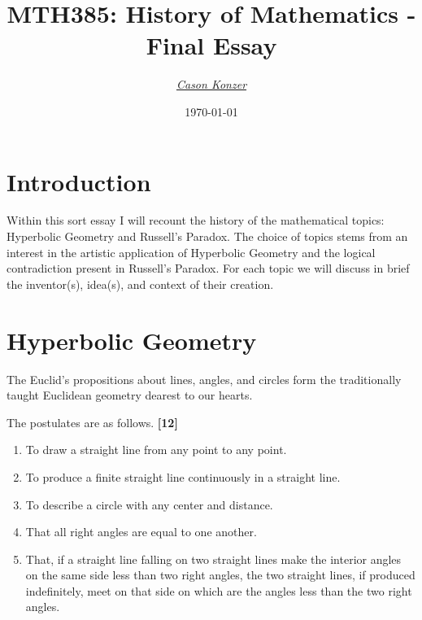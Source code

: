 \documentclass[12pt]{article}
\newcommand{\XB}{\color{black}}
\newcommand{\XV}{\color{violet}}
\begin{document}
\title{\textbf{MTH385}: History of Mathematics - Final Essay}
\date{\today}
\author{\XV\textit{\large{\href{https://github.com/casonk}{Cason Konzer}}}\XB}

\maketitle

\hrulefill

\newpage

\section{Introduction}

\hspace{5mm}
Within this sort essay I will recount the history of the mathematical topics:
Hyperbolic Geometry and Russell's Paradox.
The choice of topics stems from an interest in the artistic application of
Hyperbolic Geometry and the logical contradiction present in Russell's Paradox.
For each topic we will discuss in brief the inventor(s), idea(s), and context of their creation.

\section{Hyperbolic Geometry}

\hspace{5mm}
The Euclid's propositions about lines, angles, and circles form the traditionally taught
Euclidean geometry dearest to our hearts.

The postulates are as follows. \textbf{[12]}

\begin{enumerate}
  \item To draw a straight line from any point to any point.
  \item To produce a finite straight line continuously in a straight line.
  \item To describe a circle with any center and distance.
  \item That all right angles are equal to one another.
  \item That, if a straight line falling on two straight lines make the interior angles
  on the same side less than two right angles, the two straight lines, if produced
  indefinitely, meet on that side on which are the angles less than the
  two right angles.
\end{enumerate}
\end{document}
